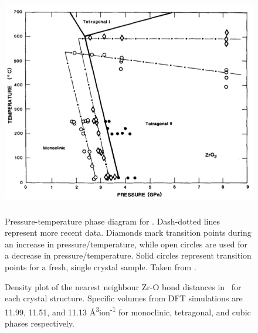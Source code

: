 \begin{figure}[htp]
  \centering
      \includegraphics[height=10cm]{images/zirconiaphasediagram.png}
  \caption{Pressure-temperature phase diagram for \zirconia . Dash-dotted lines represent more recent data. Diamonds mark transition points during an increase in pressure/temperature, while open circles are used for a decrease in pressure/temperature. Solid circles represent transition points for a fresh, single crystal sample. Taken from \cite{gando2011partial}. \label{fig:phasediagram}}
\end{figure}

\begin{figure}
\begin{center}
		\caption{Density plot of the nearest neighbour Zr-O bond distances in \zirconia\ for each crystal structure. Specific volumes from DFT simulations are 11.99, 11.51, and 11.13 \r{A}\textsuperscript{3}ion\textsuperscript{-1} for monoclinic, tetragonal, and cubic phases respectively.}
		\label{figure:zrobonddistance}
	\end{center}
\end{figure}


